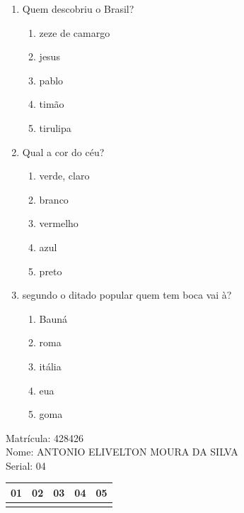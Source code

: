 \documentclass[10pt,a4paper,twocolumn]{report}
\begin{document}
 \begin{enumerate} 
    \item  Quem descobriu o Brasil?





    \begin{enumerate}
    \item  zeze de camargo

\item  jesus

\item  pablo

\item  timão

\item  tirulipa


    \end{enumerate} 
    \item  Qual a cor do céu?





    \begin{enumerate}
    \item  verde, claro

\item  branco

\item  vermelho

\item  azul

\item  preto


    \end{enumerate} 
    \item  segundo o ditado popular quem tem boca vai à?





    \begin{enumerate}
    \item  Bauná

\item  roma

\item  itália

\item  eua

\item  goma


    \end{enumerate}\end{enumerate} 
Matrícula: 428426\\ Nome: ANTONIO ELIVELTON MOURA DA SILVA \\ Serial: 04\\
\begin{tabular}{|l|l|l|l|l|}\hline
01  &02  &03  &04  &05 \\ \hline 
 & & & & \\ \hline 
\end{tabular}
 \cleardoublepage 
\end{document}
